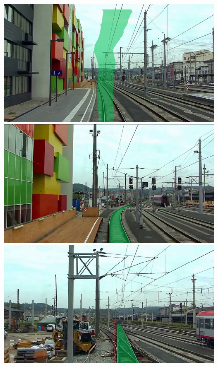 \begin{figure}[H]
    \begin{minipage}{0.195\textwidth}
        \includegraphics[width=\textwidth]{PICs/experiments/autocropExperiments/output_frames_improved/frame_100.png}
    \end{minipage}
    \hfill
    \begin{minipage}{0.195\textwidth}
        \includegraphics[width=\textwidth]{PICs/experiments/autocropExperiments/output_frames_improved/frame_700.png}
    \end{minipage}
    \hfill
    \begin{minipage}{0.195\textwidth}
        \includegraphics[width=\textwidth]{PICs/experiments/autocropExperiments/output_frames_improved/frame_1000.png}

\end{minipage}
\end{figure}
